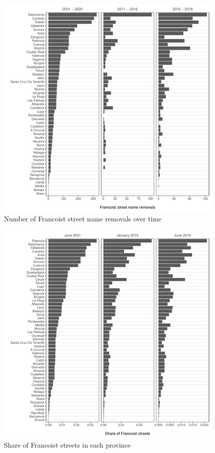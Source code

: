 \documentclass[12pt, titlepage]{article}
\begin{document}
\begin{figure}[htb!]
\centering

  \includegraphics[width = \textwidth]{img/changes_by_prov}

  \caption{Number of Francoist street name removals over time}\label{fig:chg_prov_time}

\end{figure}

\begin{figure}[htb!]
\centering

  \includegraphics[width = \textwidth]{img/fs_by_prov}

  \caption{Share of Francoist streets in each province}\label{fig:fs_prov_time}

\end{figure}
\end{document}
